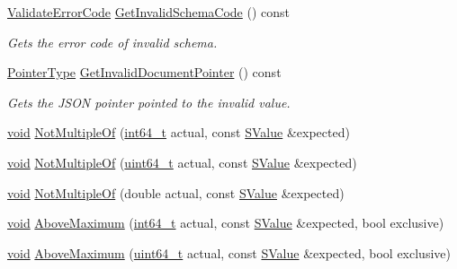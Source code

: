 \begin{DoxyCompactItemize}
\hyperlink{group__RAPIDJSON__ERRORS_ga2e1f88f94a5d9a6817a5de0ed2f0105a}{Validate\+Error\+Code} \hyperlink{classGenericSchemaValidator_aeba2093eb93f77b239e9b4c27219c982}{Get\+Invalid\+Schema\+Code} () const
\begin{DoxyCompactList}\small\item\em Gets the error code of invalid schema. \end{DoxyCompactList}\item 
\hyperlink{classGenericSchemaValidator_ae0c6c9a9c0ff6bae80e75c6705f2668b}{Pointer\+Type} \hyperlink{classGenericSchemaValidator_ac10a88c4dc138bbdbe2afd041658a3b0}{Get\+Invalid\+Document\+Pointer} () const
\begin{DoxyCompactList}\small\item\em Gets the J\+S\+ON pointer pointed to the invalid value. \end{DoxyCompactList}\item 
\hyperlink{imgui__impl__opengl3__loader_8h_ac668e7cffd9e2e9cfee428b9b2f34fa7}{void} \hyperlink{classGenericSchemaValidator_ab2f08413a2b23d73d4bbd09c8ca1f547}{Not\+Multiple\+Of} (\hyperlink{stdint_8h_a414156feea104f8f75b4ed9e3121b2f6}{int64\+\_\+t} actual, const \hyperlink{classGenericSchemaValidator_a3c004e35c7eb9fa5a28c0ccfb8ac62dc}{S\+Value} \&expected)
\item 
\hyperlink{imgui__impl__opengl3__loader_8h_ac668e7cffd9e2e9cfee428b9b2f34fa7}{void} \hyperlink{classGenericSchemaValidator_a5c59d25dc44d85404cc587ebfa7455cd}{Not\+Multiple\+Of} (\hyperlink{stdint_8h_aec6fcb673ff035718c238c8c9d544c47}{uint64\+\_\+t} actual, const \hyperlink{classGenericSchemaValidator_a3c004e35c7eb9fa5a28c0ccfb8ac62dc}{S\+Value} \&expected)
\item 
\hyperlink{imgui__impl__opengl3__loader_8h_ac668e7cffd9e2e9cfee428b9b2f34fa7}{void} \hyperlink{classGenericSchemaValidator_ae5fc8a4545fed53955ec6c57b79ca949}{Not\+Multiple\+Of} (double actual, const \hyperlink{classGenericSchemaValidator_a3c004e35c7eb9fa5a28c0ccfb8ac62dc}{S\+Value} \&expected)
\item 
\hyperlink{imgui__impl__opengl3__loader_8h_ac668e7cffd9e2e9cfee428b9b2f34fa7}{void} \hyperlink{classGenericSchemaValidator_a4c9c7db8a3488f84a5a86681ad1d8194}{Above\+Maximum} (\hyperlink{stdint_8h_a414156feea104f8f75b4ed9e3121b2f6}{int64\+\_\+t} actual, const \hyperlink{classGenericSchemaValidator_a3c004e35c7eb9fa5a28c0ccfb8ac62dc}{S\+Value} \&expected, bool exclusive)
\item 
\hyperlink{imgui__impl__opengl3__loader_8h_ac668e7cffd9e2e9cfee428b9b2f34fa7}{void} \hyperlink{classGenericSchemaValidator_a9262c73768789eb7cf8dc271cfec7f96}{Above\+Maximum} (\hyperlink{stdint_8h_aec6fcb673ff035718c238c8c9d544c47}{uint64\+\_\+t} actual, const \hyperlink{classGenericSchemaValidator_a3c004e35c7eb9fa5a28c0ccfb8ac62dc}{S\+Value} \&expected, bool exclusive)

\end{DoxyCompactItemize}
